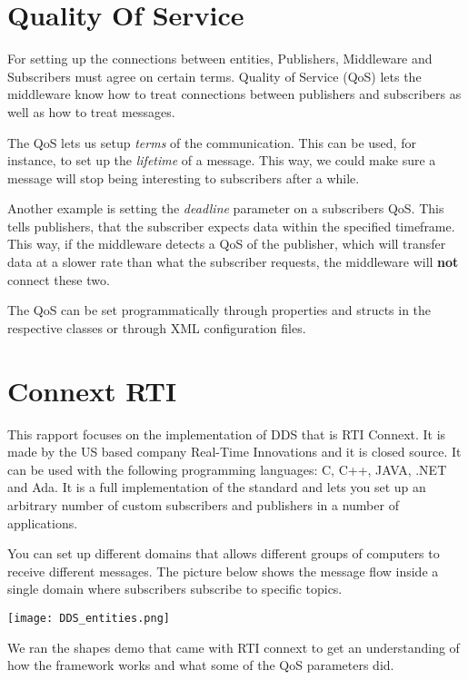 \section{Quality Of Service}
For setting up the connections between entities, Publishers, Middleware and Subscribers must agree on certain terms. Quality of Service (QoS) lets the middleware know how to treat connections between publishers and subscribers as well as how to treat messages.

The QoS lets us setup \textit{terms} of the communication. This can be used, for instance, to set up the \textit{lifetime} of a message. This way, we could make sure a message will stop being interesting to subscribers after a while. 

Another example is setting the \textit{deadline} parameter on a subscribers QoS. This tells publishers, that the subscriber expects data within the specified timeframe. This way, if the middleware detects a QoS of the publisher, which will transfer data at a slower rate than what the subscriber requests, the middleware will \textbf{not} connect these two.

The QoS can be set programmatically through properties and structs in the respective classes or through XML configuration files. 


\section{Connext RTI}
This rapport focuses on the implementation of DDS that is RTI Connext. It is made by the US based company Real-Time Innovations and it is closed source. It can be used with the following programming languages: C, C++, JAVA, .NET and Ada. 
It is a full implementation of the standard and lets you set up an arbitrary number of custom subscribers and publishers in a number of applications.

You can set up different domains that allows different groups of computers to receive different messages. The picture below shows the message flow inside a single domain where subscribers subscribe to specific topics.

\begin{center}
	\texttt{[image: DDS\_entities.png]}
\end{center}

We ran the shapes demo that came with RTI connext to get an understanding of how the framework works and what some of the QoS parameters did.

